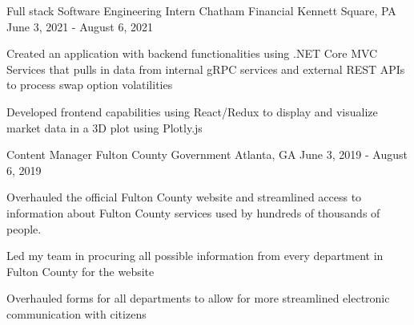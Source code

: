 \begin{cventries}
    \cventry
      {Full stack Software Engineering Intern} %
      {Chatham Financial} %
      {Kennett Square, PA} %
      {June 3, 2021 - August 6, 2021} %
      {
        \begin{cvitems} %
          \item {Created an application with backend functionalities using .NET Core MVC Services that pulls in data from internal gRPC services and external REST APIs to process swap option volatilities}
          \item {Developed frontend capabilities using React/Redux to display and visualize market data in a 3D plot using Plotly.js}
        \end{cvitems}
      }
      \cventry
          {Content Manager} %
          {Fulton County Government} %
          {Atlanta, GA} %
          {June 3, 2019 - August 6, 2019} %
          {
            \begin{cvitems} %
              \item {Overhauled the official Fulton County website and streamlined access to information about Fulton County services used by hundreds of thousands of people.}
              \item {Led my team in procuring all possible information from every department in Fulton County for the website}
              \item {Overhauled forms for all departments to allow for more streamlined electronic communication with citizens}
            \end{cvitems}
      }

\end{cventries}
